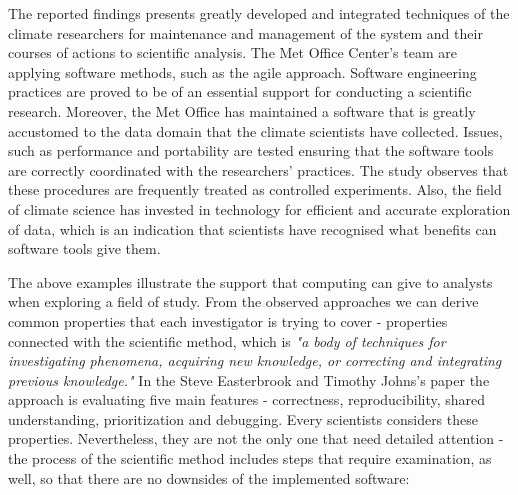 The reported findings presents greatly developed and integrated techniques of the climate researchers for maintenance and management of the system and their courses of actions to scientific analysis. The Met Office Center's team are applying software methods, such as the agile approach. Software engineering practices are proved to be of an essential support for conducting a scientific research. Moreover, the Met Office has maintained a software that is greatly accustomed to the data domain that the climate scientists have collected. Issues, such as performance and portability are tested ensuring that the software tools are correctly coordinated with the researchers' practices. The study observes that these procedures are frequently treated as controlled experiments. Also, the field of climate science has invested in technology for efficient and accurate exploration of data, which is an indication that scientists have recognised what benefits can software tools give them. \cite{easterbrook2009engineering}

The above examples illustrate the support that computing can give to analysts when exploring a field of study. From the observed approaches we can derive common properties that each investigator is trying to cover - properties connected with the scientific method, which is \textit{"a body of techniques for investigating phenomena, acquiring new knowledge, or correcting and integrating previous knowledge."}\cite{sciMethod} In the Steve Easterbrook and Timothy Johns's paper \cite{easterbrook2009engineering} the approach is evaluating five main features - correctness, reproducibility, shared understanding, prioritization and debugging. Every scientists considers these properties. Nevertheless, they are not the only one that need detailed attention - the process of the scientific method includes steps that require examination, as well, so that there are no downsides of the implemented software:\cite{sciMethod}\cite{chasmSoftware}

